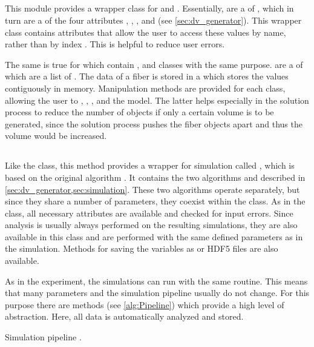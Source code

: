 \subsection{}
%
This module provides a wrapper class for  and .
Essentially,  are a  of , which in turn are a  of the four attributes , , , and  (see \cref{sec:dv_generator}).
This wrapper class contains attributes that allow the user to access these values by name, rather than by index  \code{[i]}.
This is helpful to reduce user errors.
\par
% 
The same is true for  which contain ,  and  classes with the same purpose.
 are a  of  which are a list of .
The data of a fiber is stored in a  which stores the values contiguously in memory.
Manipulation methods are provided for each class, allowing the user to , , , and  the model.
The latter helps especially in the solution process to reduce the number of objects if only a certain volume is to be generated, since the solution process pushes the fiber objects apart and thus the volume would be increased.
%
%
%
\subsection{}
% 
Like the  class, this method provides a wrapper for simulation called , which is based on the original algorithm \cite{Dohmen2015,Lucksch2016}.
It contains the two algorithms  and  described in \cref{sec:dv_generator,sec:simulation}.
These two algorithms operate separately, but since they share a number of parameters, they coexist within the class.
As in the  class, all necessary attributes are available and checked for input errors.
Since analysis is usually always performed on the resulting simulations, they are also available in this class and are performed with the same defined parameters as in the simulation.
Methods for saving the variables as  or \ac{HDF5} files are also available.
\par
% 
As in the experiment, the simulations can run with the same routine.
This means that many parameters and the simulation pipeline usually do not change.
For this purpose there are  methods (see \cref{alg:Pipeline}) which provide a high level of abstraction.
Here, all data is automatically analyzed and stored.
%
\begin{lstfloat}[!tb]
\centering
\scalebox{0.75}{
\begin{minipage}{\the\textwidth}

\end{minipage}}
\caption{Simulation pipeline .}
\label{alg:Pipeline}
\end{lstfloat}
%
%
